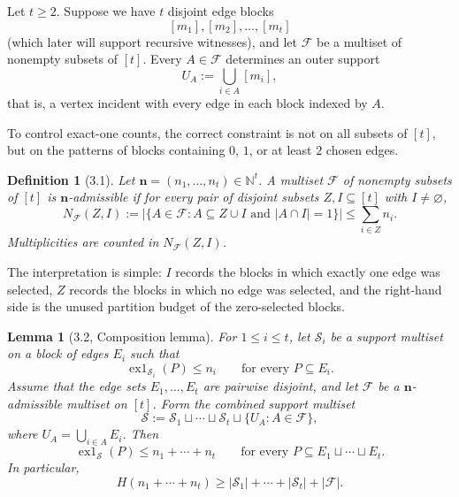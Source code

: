 \documentclass[11pt]{article}
\newtheorem{lemma}[theorem]{Lemma}
\newtheorem{definition}[theorem]{Definition}
\begin{document}
Let $t \ge 2$. Suppose we have $t$ disjoint edge blocks
\[
[m_1], [m_2], \dots, [m_t]
\]
(which later will support recursive witnesses), and let $\mathcal F$ be a multiset of nonempty subsets of $[t]$. Every $A \in \mathcal F$ determines an outer support
\[
U_A := \bigcup_{i \in A} [m_i],
\]
that is, a vertex incident with every edge in each block indexed by $A$.

To control exact-one counts, the correct constraint is not on all subsets of $[t]$, but on the patterns of blocks containing $0$, $1$, or at least $2$ chosen edges.

\begin{definition}[3.1]
Let $\mathbf n = (n_1,\dots,n_t) \in \mathbb N^t$. A multiset $\mathcal F$ of nonempty subsets of $[t]$ is $\mathbf n$-admissible if for every pair of disjoint subsets $Z,I \subseteq [t]$ with $I \neq \varnothing$,
\[
N_{\mathcal F}(Z,I) := \bigl|\{ A \in \mathcal F : A \subseteq Z \cup I \text{ and } |A \cap I|=1\}\bigr| \le \sum_{i \in Z} n_i.
\]
Multiplicities are counted in $N_{\mathcal F}(Z,I)$.
\end{definition}

The interpretation is simple: $I$ records the blocks in which exactly one edge was selected, $Z$ records the blocks in which no edge was selected, and the right-hand side is the unused partition budget of the zero-selected blocks.

\begin{lemma}[3.2, Composition lemma]
For $1 \le i \le t$, let $\mathcal S_i$ be a support multiset on a block of edges $E_i$ such that
\[
\operatorname{ex1}_{\mathcal S_i}(P) \le n_i \qquad \text{for every } P \subseteq E_i.
\]
Assume that the edge sets $E_1,\dots,E_t$ are pairwise disjoint, and let $\mathcal F$ be a $\mathbf n$-admissible multiset on $[t]$. Form the combined support multiset
\[
\mathcal S := \mathcal S_1 \sqcup \cdots \sqcup \mathcal S_t \sqcup \{ U_A : A \in \mathcal F \},
\]
where $U_A = \bigcup_{i \in A} E_i$. Then
\[
\operatorname{ex1}_{\mathcal S}(P) \le n_1 + \cdots + n_t \qquad \text{for every } P \subseteq E_1 \sqcup \cdots \sqcup E_t.
\]
In particular,
\[
H(n_1 + \cdots + n_t) \ge |\mathcal S_1| + \cdots + |\mathcal S_t| + |\mathcal F|.
\]
\end{lemma}
\end{document}
